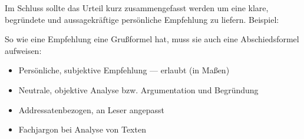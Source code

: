 \begin{itemize}
	Im Schluss sollte das Urteil kurz zusammengefasst werden um eine klare, begr\"{u}ndete und aussagekr\"{a}ftige pers\"{o}nliche Empfehlung zu liefern. Beispiel:



	So wie eine Empfehlung eine Gru\ss{}formel hat, muss sie auch eine Abschiedsformel aufweisen:


\end{itemize}


\begin{itemize}
	\item Pers\"{o}nliche, subjektive Empfehlung ---  erlaubt (in Ma\ss{}en)
	\item Neutrale, objektive Analyse bzw. Argumentation und Begr\"{u}ndung
	\item Addressatenbezogen, an Leser angepasst
	\item Fachjargon bei Analyse von Texten
\end{itemize}

